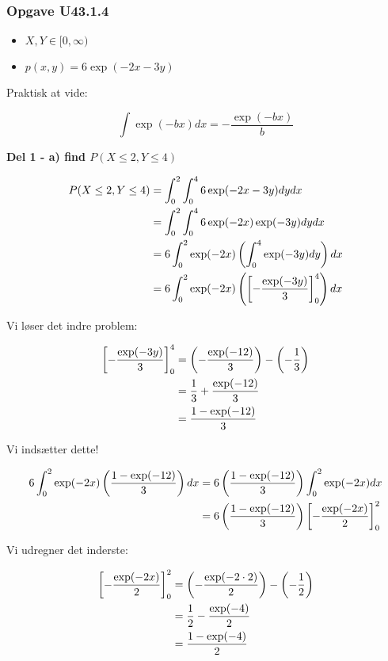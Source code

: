 \subsubsection{Opgave U43.1.4 }

\begin{itemize}
    \item $X,Y  \in [0,\infty)$
    \item $p(x,y) = 6 \exp(-2x -3y)$
\end{itemize}

Praktisk at vide:

\begin{equation}
    \int \exp(-b x) dx = -\frac{\exp(-b x)}{b}
\end{equation}

\textbf{Del 1 - a) find $P(X \leq 2, Y \leq 4)$}

\begin{align}
    P(X \leq 2, Y \leq 4) &= \int_0^2 \int_0^{4} 6 \exp(-2x -3y) dy dx \\
    &= \int_0^2 \int_0^{4} 6 \exp(-2x)\exp(-3y) dy dx \\
    &= 6 \int_0^2  \exp(-2x) \left( \int_0^{4}  \exp(-3y) dy \right) dx \\
    &=   6 \int_0^2  \exp(-2x) \left( \left[ -\frac{\exp(-3y)}{3}\right]_0^4 \right) dx 
\end{align}


Vi løser det indre problem:

\begin{align}
    \left[ -\frac{\exp(-3y)}{3}\right]_0^4 &= \left(-\frac{\exp(-12)}{3}\right) - \left( -\frac{1}{3} \right) \\
    &= \frac{1}{3} + \frac{\exp(-12)}{3} \\ 
    &= \frac{1 - \exp(-12)}{3}
\end{align}

Vi indsætter dette!

\begin{align}
    6 \int_0^2  \exp(-2x) \left( \frac{1 - \exp(-12)}{3} \right) dx &= 6 \left(\frac{1 - \exp(-12)}{3} \right) \int_0^2  \exp(-2x) dx \\ 
    &= 6 \left( \frac{1 - \exp(-12)}{3} \right) \left[ -\frac{\exp(-2x)}{2}\right]_0^2
\end{align}

Vi udregner det inderste:

\begin{align}
    \left[ -\frac{\exp(-2x)}{2}\right]_0^2 &= \left( - \frac{\exp(- 2\cdot2 )}{2}\right) - \left( -\frac{1}{2} \right) \\
    &=  \frac{1}{2} - \frac{\exp(- 4 )}{2} \\ 
    &= \frac{1 - \exp(-4)}{2}
\end{align}

